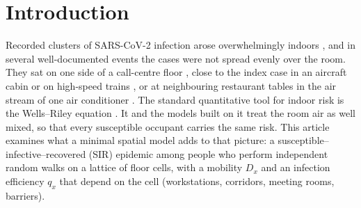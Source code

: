 \section{Introduction}\label{s1_intro:sec}

Recorded clusters of SARS-CoV-2 infection arose overwhelmingly indoors
\citep{qian2021indoor,leclerc2020settings}, and in several well-documented events the cases were not spread
evenly over the room. They sat on one side of a call-centre floor \citep{park2020}, close to the index case in
an aircraft cabin \citep{khanh2020} or on high-speed trains \citep{hu2021}, or at neighbouring restaurant
tables in the air stream of one air conditioner \citep{lu2020,li2021}.
The standard quantitative tool for indoor risk is the Wells--Riley equation
\citep{wells1955airborne,riley1978,szeto2010review}. It and the models built on it
\citep{noakes2006modelling,bazant2021guideline} treat the room air as well mixed, so that every susceptible
occupant carries the same risk.
This article examines what a minimal spatial model adds to that picture: a
susceptible--infective--recovered (SIR) epidemic among people who perform independent random walks on a
lattice of floor cells, with a mobility $D_x$ and an infection efficiency $q_x$ that depend on the cell
(workstations, corridors, meeting rooms, barriers).

